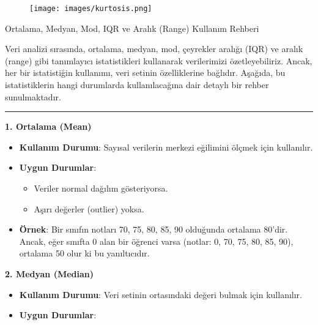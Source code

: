 \documentclass[
  letterpaper,
  DIV=11,
  numbers=noendperiod]{scrartcl}
\begin{document}
\begin{figure}

{\centering \texttt{[image: images/kurtosis.png]}

}

\end{figure}

\begin{tcolorbox}[enhanced jigsaw, bottomrule=.15mm, opacitybacktitle=0.6, rightrule=.15mm, left=2mm, toprule=.15mm, leftrule=.75mm, titlerule=0mm, colframe=quarto-callout-note-color-frame, opacityback=0, arc=.35mm, colbacktitle=quarto-callout-note-color!10!white, title=\textcolor{quarto-callout-note-color}{\faInfo}\hspace{0.5em}{Not}, coltitle=black, breakable, bottomtitle=1mm, toptitle=1mm, colback=white]

Ortalama, Medyan, Mod, IQR ve Aralık (Range) Kullanım Rehberi

Veri analizi sırasında, ortalama, medyan, mod, çeyrekler aralığı (IQR)
ve aralık (range) gibi tanımlayıcı istatistikleri kullanarak
verilerimizi özetleyebiliriz. Ancak, her bir istatistiğin kullanımı,
veri setinin özelliklerine bağlıdır. Aşağıda, bu istatistiklerin hangi
durumlarda kullanılacağına dair detaylı bir rehber sunulmaktadır.

\begin{center}\rule{0.5\linewidth}{0.5pt}\end{center}

\textbf{1. Ortalama (Mean)}

\begin{itemize}
\item
  \textbf{Kullanım Durumu}: Sayısal verilerin merkezi eğilimini ölçmek
  için kullanılır.
\item
  \textbf{Uygun Durumlar}:

  \begin{itemize}
  \item
    Veriler normal dağılım gösteriyorsa.
  \item
    Aşırı değerler (outlier) yoksa.
  \end{itemize}
\item
  \textbf{Örnek}: Bir sınıfın notları 70, 75, 80, 85, 90 olduğunda
  ortalama 80'dir. Ancak, eğer sınıfta 0 alan bir öğrenci varsa (notlar:
  0, 70, 75, 80, 85, 90), ortalama 50 olur ki bu yanıltıcıdır.
\end{itemize}

\textbf{2. Medyan (Median)}

\begin{itemize}
\item
  \textbf{Kullanım Durumu}: Veri setinin ortasındaki değeri bulmak için
  kullanılır.
\item
  \textbf{Uygun Durumlar}:


\end{itemize}
\end{tcolorbox}
\end{document}
